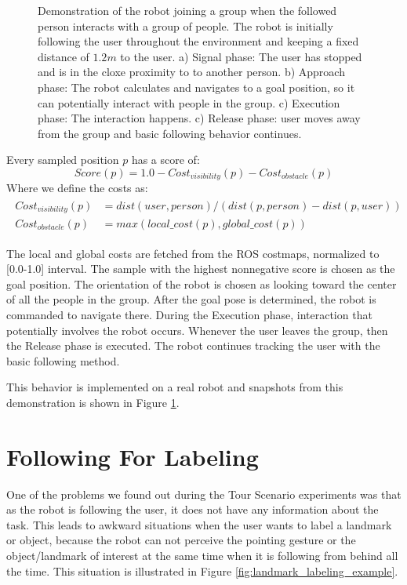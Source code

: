 \begin{figure}[ht!]
{        }
    \caption{Demonstration of the robot joining a group when the followed person interacts with a group of people. The robot is initially following the user throughout the environment and keeping a fixed distance of $1.2m$ to the user. a) Signal phase: The user has stopped and is in the cloxe proximity to to another person. b) Approach phase: The robot calculates and navigates to a goal position, so it can potentially interact with people in the group. c) Execution phase: The interaction happens. c) Release phase: user moves away from the group and basic following behavior continues.}
   \label{fig:situtation_aware_joining_group}
\end{figure}

Every sampled position $p$ has a score of:
\[
Score(p) = 1.0 - Cost_{visibility}(p) - Cost_{obstacle}(p)
\]
Where we define the costs as:
\begin{align} 
\begin{split}
Cost_{visibility}(p)&=dist(user,person)/(dist(p,person)-dist(p,user)) \\
Cost_{obstacle}(p)&=max(local\_cost(p),global\_cost(p))
\end{split}
\end{align}

The local and global costs are fetched from the ROS costmaps, normalized to [0.0-1.0] interval. The sample with the highest nonnegative score is chosen as the goal position. The orientation of the robot is chosen as looking toward the center of all the people in the group. After the goal pose is determined, the robot is commanded to navigate there. During the Execution phase, interaction that potentially involves the robot occurs. Whenever the user leaves the group, then the Release phase is executed. The robot continues tracking the user with the basic following method.

This behavior is implemented on a real robot and snapshots from this demonstration is shown in Figure \ref{fig:situtation_aware_joining_group}.

\section{Following For Labeling}
\label{sec:following_landmark_labeling}

One of the problems we found out during the Tour Scenario experiments was that as the robot is following the user, it does not have any information about the task. This leads to awkward situations when the user wants to label a landmark or object, because the robot can not perceive the pointing gesture or the object/landmark of interest at the same time when it is following from behind all the time. This situation is illustrated in Figure \ref{fig:landmark_labeling_example}.

